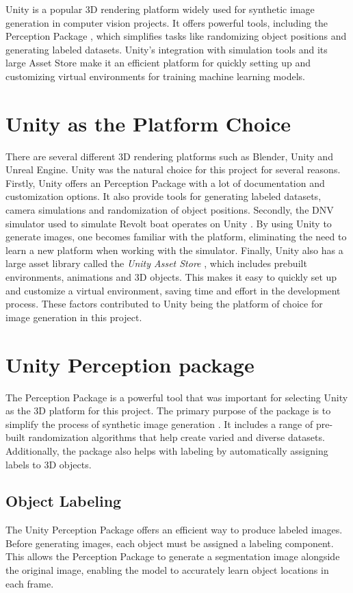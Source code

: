 Unity is a popular 3D rendering platform widely used for synthetic image generation in computer vision projects. It offers powerful tools, including the Perception Package \cite{unity-perception2022}, which simplifies tasks like randomizing object positions and generating labeled datasets. Unity's integration with simulation tools and its large Asset Store \cite{UnityAssetStore} make it an efficient platform for quickly setting up and customizing virtual environments for training machine learning models.

\section{Unity as the Platform Choice}
There are several different 3D rendering platforms such as Blender, Unity and Unreal Engine. Unity was the natural choice for this project for several reasons. Firstly, Unity offers an Perception Package \cite{unity-perception2022} with a lot of documentation and customization options. It also provide tools for generating labeled datasets, camera simulations and randomization of object positions. Secondly, the DNV simulator used to simulate Revolt boat operates on Unity \cite{dnv_wiki}. By using Unity to generate images, one becomes familiar with the platform, eliminating the need to learn a new platform when working with the simulator. Finally, Unity also has a large asset library called the \textit{Unity Asset Store} \cite{UnityAssetStore}, which includes prebuilt environments, animations and 3D objects. This makes it easy to quickly set up and customize a virtual environment, saving time and effort in the development process. These factors contributed to Unity being the platform of choice for image generation in this project.


\section{Unity Perception package}
The Perception Package is a powerful tool that was important for selecting Unity as the 3D platform for this project. The primary purpose of the package is to simplify the process of synthetic image generation \cite{borkman2021unityperceptiongeneratesynthetic}. It includes a range of pre-built randomization algorithms that help create varied and diverse datasets. Additionally, the package also helps with labeling by automatically assigning labels to 3D objects.

\subsection{Object Labeling}
The Unity Perception Package offers an efficient way to produce labeled images. Before generating images, each object must be assigned a labeling component. This allows the Perception Package to generate a segmentation image alongside the original image, enabling the model to accurately learn object locations in each frame.



